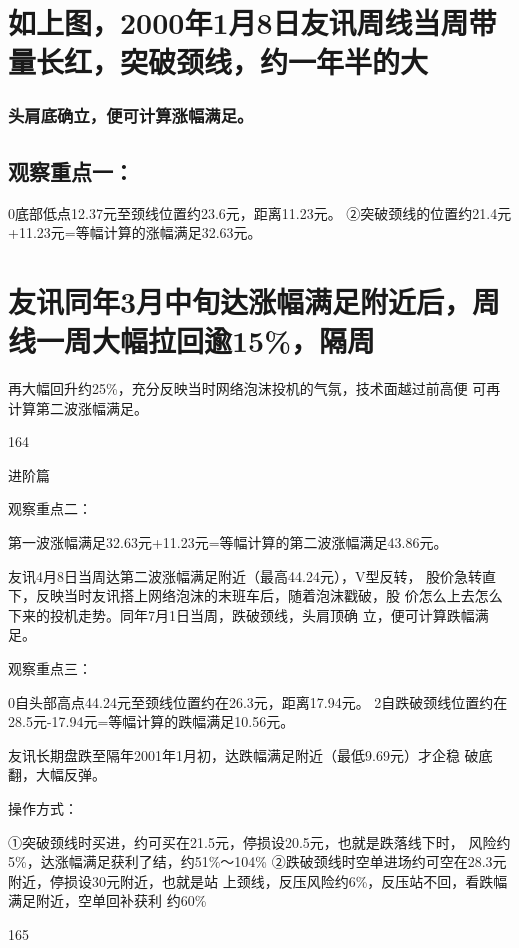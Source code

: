 \documentclass{article}
\begin{document}
\section{如上图，2000年1月8日友讯周线当周带量长红，突破颈线，约一年半的大}

\subsubsection{头肩底确立，便可计算涨幅满足。}

\subsection{观察重点一：}

0底部低点12.37元至颈线位置约23.6元，距离11.23元。 ②突破颈线的位置约21.4元+11.23元=等幅计算的涨幅满足32.63元。

\section{友讯同年3月中旬达涨幅满足附近后，周线一周大幅拉回逾15\%，隔周}

再大幅回升约25\%，充分反映当时网络泡沫投机的气氛，技术面越过前高便 可再计算第二波涨幅满足。

164

\clearpage

进阶篇

观察重点二：

第一波涨幅满足32.63元+11.23元=等幅计算的第二波涨幅满足43.86元。

友讯4月8日当周达第二波涨幅满足附近（最高44.24元），V型反转， 股价急转直下，反映当时友讯搭上网络泡沫的末班车后，随着泡沫戳破，股 价怎么上去怎么下来的投机走势。同年7月1日当周，跌破颈线，头肩顶确 立，便可计算跌幅满足。

观察重点三：

0自头部高点44.24元至颈线位置约在26.3元，距离17.94元。 2自跌破颈线位置约在28.5元-17.94元=等幅计算的跌幅满足10.56元。

友讯长期盘跌至隔年2001年1月初，达跌幅满足附近（最低9.69元）才企稳 破底翻，大幅反弹。

操作方式：

①突破颈线时买进，约可买在21.5元，停损设20.5元，也就是跌落线下时， 风险约5\%，达涨幅满足获利了结，约51\%～104\% ②跌破颈线时空单进场约可空在28.3元附近，停损设30元附近，也就是站 上颈线，反压风险约6\%，反压站不回，看跌幅满足附近，空单回补获利 约60\%

165

\clearpage
\end{document}
